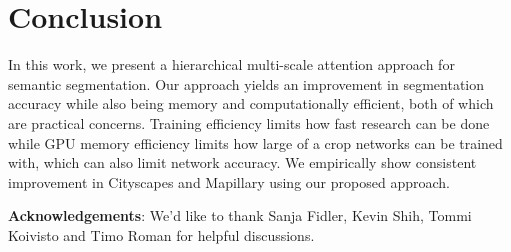 \documentclass{article}
\begin{document}
\section{Conclusion}
In this work, we present a hierarchical multi-scale attention approach for semantic segmentation. Our approach yields an improvement in segmentation accuracy while also being memory and computationally efficient, both of which are practical concerns. Training efficiency limits how fast research can be done while GPU memory efficiency limits how large of a crop networks can be trained with, which can also limit network accuracy. We empirically show consistent improvement in Cityscapes and Mapillary using our proposed approach.

\textbf{Acknowledgements}: We'd like to thank Sanja Fidler, Kevin Shih, Tommi Koivisto and Timo Roman for helpful discussions. 

  
 
\end{document}

